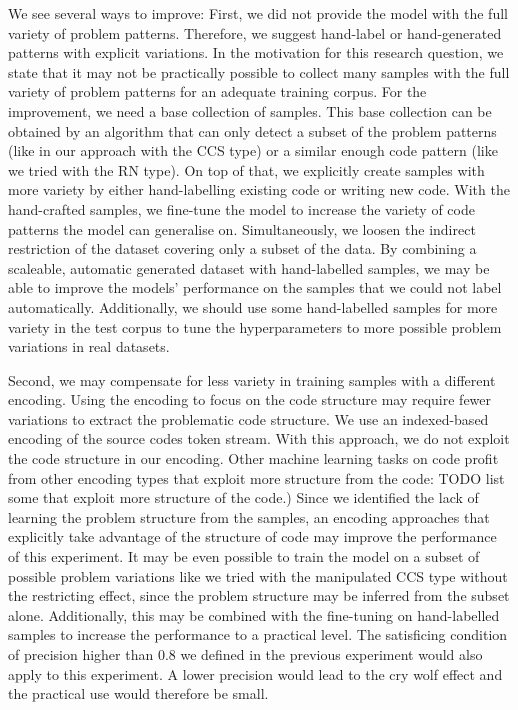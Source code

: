 We see several ways to improve:
First, we did not provide the model with the full variety of problem patterns. Therefore, we suggest hand-label or hand-generated patterns with explicit variations.
In the motivation for this research question, we state that it may not be practically possible to collect many samples with the full variety of problem patterns for an adequate training corpus. For the improvement, we need a base collection of samples. This base collection can be obtained by an algorithm that can only detect a subset of the problem patterns (like in our approach with the CCS type) or a similar enough code pattern (like we tried with the RN type). On top of that, we explicitly create samples with more variety by either hand-labelling existing code or writing new code. With the hand-crafted samples, we fine-tune the model to increase the variety of code patterns the model can generalise on. Simultaneously, we loosen the indirect restriction of the dataset covering only a subset of the data. By combining a scaleable, automatic generated dataset with hand-labelled samples, we may be able to improve the models' performance on the samples that we could not label automatically. Additionally, we should use some hand-labelled samples for more variety in the test corpus to tune the hyperparameters to more possible problem variations in real datasets.

Second, we may compensate for less variety in training samples with a different encoding. Using the encoding to focus on the code structure may require fewer variations to extract the problematic code structure. We use an indexed-based encoding of the source codes token stream. With this approach, we do not exploit the code structure in our encoding. Other machine learning tasks on code profit from other encoding types that exploit more structure from the code: TODO list some that exploit more structure of the code.) Since we identified the lack of learning the problem structure from the samples, an encoding approaches that explicitly take advantage of the structure of code may improve the performance of this experiment. It may be even possible to train the model on a subset of possible problem variations like we tried with the manipulated CCS type without the restricting effect, since the problem structure may be inferred from the subset alone.
Additionally, this may be combined with the fine-tuning on hand-labelled samples to increase the performance to a practical level. The satisficing condition of precision higher than 0.8 we defined in the previous experiment would also apply to this experiment. A lower precision would lead to the cry wolf effect and the practical use would therefore be small.

